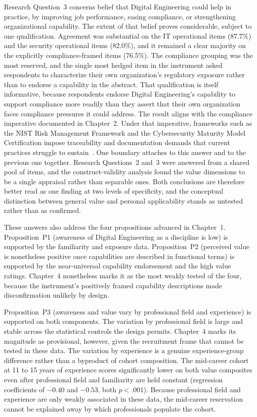 Research Question~3 concerns belief that Digital Engineering could help in practice, by improving job performance, easing compliance, or strengthening organizational capability. The extent of that belief proves considerable, subject to one qualification. Agreement was substantial on the IT operational items (87.7\%) and the security operational items (82.0\%), and it remained a clear majority on the explicitly compliance-framed items (76.5\%). The compliance grouping was the most reserved, and the single most hedged item in the instrument asked respondents to characterize their own organization's regulatory exposure rather than to endorse a capability in the abstract. That qualification is itself informative, because respondents endorse Digital Engineering's capability to support compliance more readily than they assert that their own organization faces compliance pressures it could address. The result aligns with the compliance imperative documented in Chapter~2. Under that imperative, frameworks such as the NIST Risk Management Framework and the Cybersecurity Maturity Model Certification impose traceability and documentation demands that current practices struggle to sustain~\parencite{Force_2020, DoD_CMMC_2024}. One boundary attaches to this answer and to the previous one together. Research Questions~2 and~3 were answered from a shared pool of items, and the construct-validity analysis found the value dimensions to be a single appraisal rather than separable ones. Both conclusions are therefore better read as one finding at two levels of specificity, and the conceptual distinction between general value and personal applicability stands as untested rather than as confirmed.

These answers also address the four propositions advanced in Chapter~1. Proposition~P1 (awareness of Digital Engineering as a discipline is low) is supported by the familiarity and exposure data. Proposition~P2 (perceived value is nonetheless positive once capabilities are described in functional terms) is supported by the near-universal capability endorsement and the high value ratings. Chapter~4 nonetheless marks it as the most weakly tested of the four, because the instrument's positively framed capability descriptions made disconfirmation unlikely by design.

Proposition~P3 (awareness and value vary by professional field and experience) is supported on both components. The variation by professional field is large and stable across the statistical controls the design permits. Chapter~4 marks its magnitude as provisional, however, given the recruitment frame that cannot be tested in these data. The variation by experience is a genuine experience-group difference rather than a byproduct of cohort composition. The mid-career cohort at 11 to 15 years of experience scores significantly lower on both value composites even after professional field and familiarity are held constant (regression coefficients of $-0.40$ and $-0.53$, both $p<.001$). Because professional field and experience are only weakly associated in these data, the mid-career reservation cannot be explained away by which professionals populate the cohort.


